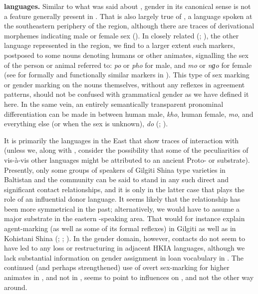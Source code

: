 \documentclass[output=collectionpaper]{langsci/langscibook}
\begin{document}
\textbf{ languages.} Similar to what was said about , gender in its canonical sense is not a feature generally present in . That is also largely true of , a  language spoken at the southeastern periphery of the region, although there are traces of derivational morphemes indicating male or female sex (\citealt[118--127]{Zemp2013}). In closely related  (\citealt[81]{Bielmeier1985}; \citealt[4]{Read1934}), the other  language represented in the region, we find to a larger extent such markers, postposed to some nouns denoting humans or other animates, signalling the sex of the person or animal referred to: \textit{po} or \textit{pho} for male, and \textit{mo} or \textit{nɡ}\textit{o} for female (see  for formally and functionally similar markers in ). This type of sex marking or gender marking on the nouns themselves, without any reflexes in agreement patterns, should not be confused with grammatical gender as we have defined it here. In the same vein, an entirely semantically transparent pronominal differentiation can be made in  between human male, \textit{kho}, human female, \textit{mo}, and everything else (or when the sex is unknown), \textit{do} (\citealt[12--13]{Read1934}; \citealt[76]{Bielmeier1985}).

It is primarily the  languages in the East that show traces of interaction with  (unless we, along with \citet[305]{Tikkanen1988}, consider the possibility that some of the peculiarities of  vis-à-vis other  languages might be attributed to an ancient Proto- or  substrate). Presently, only some groups of speakers of Gilgiti Shina type varieties in Baltistan and the  community can be said to stand in any such direct and significant contact relationships, and it is only in the latter case that  plays the role of an influential donor language. It seems likely that the relationship has been more symmetrical in the past; alternatively, we would have to assume a major  substrate in the eastern -speaking area. That would for instance explain agent-marking (as well as some of its formal reflexes) in Gilgiti as well as in Kohistani Shina (\citealt[162--163]{Liljegren2014}; \citealt[211]{Bailey1924}; \citealt[213--214]{Hook2004}). In the gender domain, however,  contacts do not seem to have led to any loss or restructuring in adjacent HKIA languages, although we lack substantial information on gender assignment in  loan vocabulary in . The continued (and perhaps strengthened) use of overt sex-marking for higher animates in , and not in , seems to point to  influences on , and not the other way around.
\end{document}
